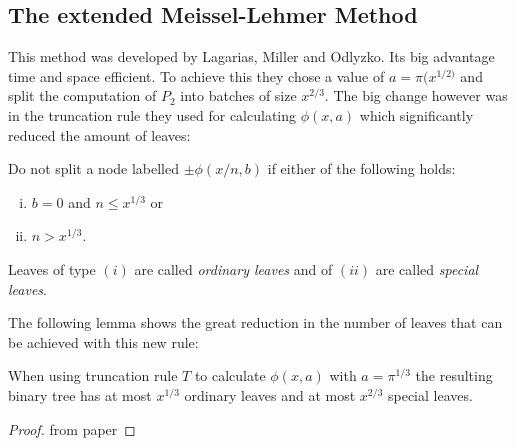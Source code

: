 \subsection{The extended Meissel-Lehmer Method}
This method was developed by Lagarias, Miller and Odlyzko. 
Its big advantage time and space efficient. To achieve this 
they chose a value of $a = \pi(x^{1/2)}$ and split the computation of $P_{2}$ into batches of size $x^{2 / 3}$.
The big change however was in the truncation rule they used for calculating $\phi(x,a)$ which significantly reduced the amount of leaves:

\begin{definition}
	Do not split a node labelled $\pm \phi(x / n,b)$ if either of the following holds:
	\begin{enumerate}[(i)]
		\item $b=0$ and $n \leq x^{1 / 3}$ or
		\item $n > x^{1 / 3}$.
	\end{enumerate}
	Leaves of type $(i)$ are called \emph{ordinary leaves} and of $(ii)$ are called \emph{special leaves}.
\end{definition}
The following lemma shows the great reduction in the number of leaves that can be achieved with this new rule:

\begin{lemma}
	When using truncation rule $T$ to calculate $\phi(x,a)$ with $a = \pi^{1 / 3}$ the resulting binary tree has at most $x^{1 / 3}$ ordinary leaves 
	and at most $x^{2 / 3}$ special leaves.
\end{lemma}

\begin{proof}
	from paper
\end{proof}
























%


